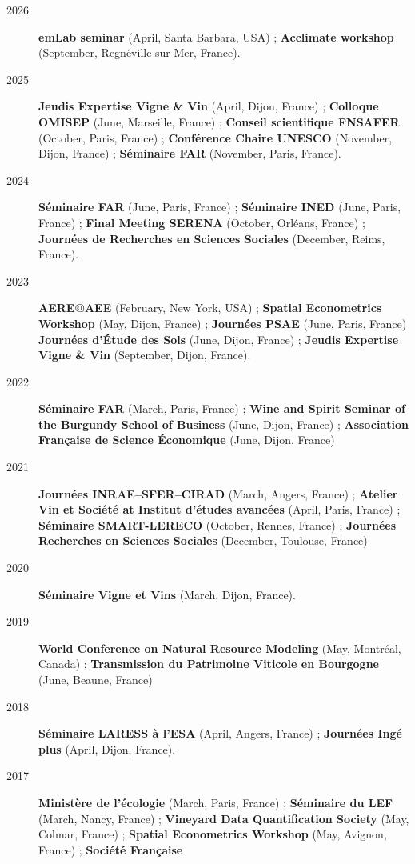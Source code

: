 \documentclass[12pt, a4paper]{./style}
\begin{document}
\begin{description}
\item[{2026}] \textbf{emLab seminar} (April, Santa Barbara, USA) ;
\textbf{Acclimate workshop} (September, Regnéville-sur-Mer,
France).
\item[{2025}] \textbf{Jeudis Expertise Vigne \& Vin} (April, Dijon, France) ;
\textbf{Colloque OMISEP} (June, Marseille, France) ; \textbf{Conseil
scientifique FNSAFER} (October, Paris, France) ; \textbf{Conférence
Chaire UNESCO} (November, Dijon, France) ; \textbf{Séminaire FAR}
(November, Paris, France).
\item[{2024}] \textbf{Séminaire FAR} (June, Paris, France) ; \textbf{Séminaire INED}
(June, Paris, France) ; \textbf{Final Meeting SERENA} (October, Orléans,
France) ; \textbf{Journées de Recherches en Sciences Sociales} (December,
Reims, France).
\item[{2023}] \textbf{AERE@AEE} (February, New York, USA) ; \textbf{Spatial
Econometrics Workshop} (May, Dijon, France) ; \textbf{Journées PSAE}
(June, Paris, France) \textbf{Journées d'Étude des Sols} (June, Dijon,
France) ; \textbf{Jeudis Expertise Vigne \& Vin} (September, Dijon,
France).
\item[{2022}] \textbf{Séminaire FAR} (March, Paris, France) ; \textbf{Wine
and Spirit Seminar of the Burgundy School of Business}
(June, Dijon, France) ; \textbf{Association Française de
Science Économique} (June, Dijon, France)
\item[{2021}] \textbf{Journées INRAE--SFER--CIRAD} (March, Angers, France) ;
\textbf{Atelier Vin et Société at Institut d’études avancées} (April,
Paris, France) ; \textbf{Séminaire SMART-LERECO} (October, Rennes,
France) ; \textbf{Journées Recherches en Sciences Sociales} (December,
Toulouse, France)
\item[{2020}] \textbf{Séminaire Vigne et Vins} (March, Dijon, France).
\item[{2019}] \textbf{World Conference on Natural Resource Modeling} (May,
Montréal, Canada) ; \textbf{Transmission du Patrimoine Viticole en
Bourgogne} (June, Beaune, France)
\item[{2018}] \textbf{Séminaire LARESS à l'ESA} (April, Angers, France) ;
\textbf{Journées Ingé plus} (April, Dijon, France).
\item[{2017}] \textbf{Ministère de l'écologie} (March, Paris, France) ;
\textbf{Séminaire du LEF} (March, Nancy, France) ; \textbf{Vineyard Data
Quantification Society} (May, Colmar, France) ; \textbf{Spatial
Econometrics Workshop} (May, Avignon, France) ; \textbf{Société Française
}
\end{description}
\end{document}
